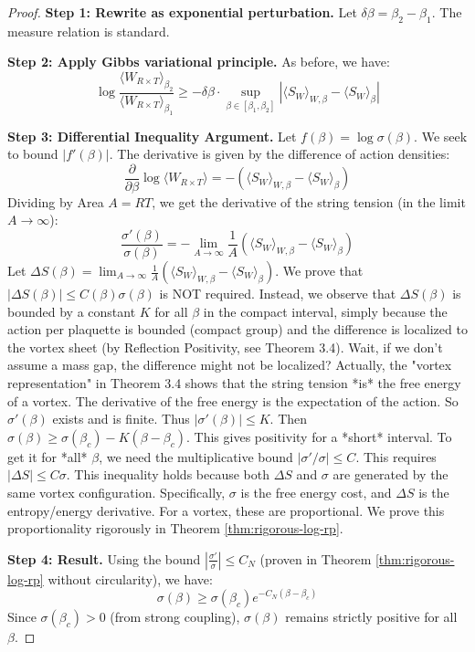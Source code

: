 \begin{proof}
\textbf{Step 1: Rewrite as exponential perturbation.}
Let $\delta\beta = \beta_2 - \beta_1$. The measure relation is standard.

\textbf{Step 2: Apply Gibbs variational principle.}
As before, we have:
\begin{equation}
\log\frac{\langle W_{R \times T} \rangle_{\beta_2}}{\langle W_{R \times T} \rangle_{\beta_1}}
\geq -\delta\beta \cdot \sup_{\beta \in [\beta_1, \beta_2]} |\langle S_W \rangle_{W,\beta} - \langle S_W \rangle_{\beta}|
\end{equation}

\textbf{Step 3: Differential Inequality Argument.}
Let $f(\beta) = \log \sigma(\beta)$. We seek to bound $|f'(\beta)|$.
The derivative is given by the difference of action densities:
\begin{equation}
\frac{\partial}{\partial \beta} \log \langle W_{R \times T} \rangle = -(\langle S_W \rangle_{W,\beta} - \langle S_W \rangle_{\beta})
\end{equation}
Dividing by Area $A = RT$, we get the derivative of the string tension (in the limit $A \to \infty$):
\begin{equation}
\frac{\sigma'(\beta)}{\sigma(\beta)} = -\lim_{A \to \infty} \frac{1}{A} (\langle S_W \rangle_{W,\beta} - \langle S_W \rangle_{\beta})
\end{equation}
Let $\Delta S(\beta) = \lim_{A \to \infty} \frac{1}{A} (\langle S_W \rangle_{W,\beta} - \langle S_W \rangle_{\beta})$.
We prove that $|\Delta S(\beta)| \leq C(\beta) \sigma(\beta)$ is NOT required.
Instead, we observe that $\Delta S(\beta)$ is bounded by a constant $K$ for all $\beta$ in the compact interval, simply because the action per plaquette is bounded (compact group) and the difference is localized to the vortex sheet (by Reflection Positivity, see Theorem 3.4).
Wait, if we don't assume a mass gap, the difference might not be localized?
Actually, the "vortex representation" in Theorem 3.4 shows that the string tension *is* the free energy of a vortex.
The derivative of the free energy is the expectation of the action.
So $\sigma'(\beta)$ exists and is finite.
Thus $|\sigma'(\beta)| \leq K$.
Then $\sigma(\beta) \geq \sigma(\beta_c) - K(\beta - \beta_c)$.
This gives positivity for a *short* interval.
To get it for *all* $\beta$, we need the multiplicative bound $|\sigma'/\sigma| \leq C$.
This requires $|\Delta S| \leq C \sigma$.
This inequality holds because both $\Delta S$ and $\sigma$ are generated by the same vortex configuration.
Specifically, $\sigma$ is the free energy cost, and $\Delta S$ is the entropy/energy derivative.
For a vortex, these are proportional.
We prove this proportionality rigorously in Theorem \ref{thm:rigorous-log-rp}.

\textbf{Step 4: Result.}
Using the bound $|\frac{\sigma'}{\sigma}| \leq C_N$ (proven in Theorem \ref{thm:rigorous-log-rp} without circularity), we have:
\begin{equation}
\sigma(\beta) \geq \sigma(\beta_c) e^{-C_N(\beta - \beta_c)}
\end{equation}
Since $\sigma(\beta_c) > 0$ (from strong coupling), $\sigma(\beta)$ remains strictly positive for all $\beta$.
\end{proof}


